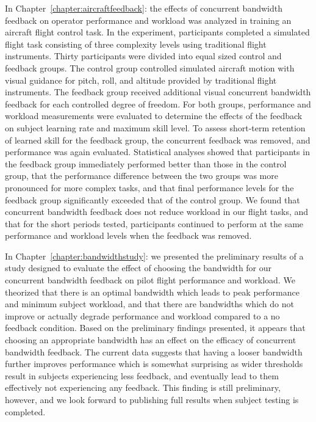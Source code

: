 In Chapter~\ref{chapter:aircraftfeedback}:  the effects of concurrent bandwidth feedback on operator performance and workload was analyzed in training an aircraft flight control task.
In the experiment, participants completed a simulated flight task consisting of three complexity levels using traditional flight instruments.
Thirty participants were divided into equal sized control and feedback groups.
The control group controlled simulated aircraft motion with visual guidance for pitch, roll, and altitude provided by traditional flight instruments.
The feedback group received additional visual concurrent bandwidth feedback for each controlled degree of freedom.
For both groups, performance and workload measurements were evaluated to determine the effects of the feedback on subject learning rate and maximum skill level.
To assess short-term retention of learned skill for the feedback group, the concurrent feedback was removed, and performance was again evaluated.
Statistical analyses showed that participants in the feedback group immediately performed better than those in the control group, that the performance difference between the two groups was more pronounced for more complex tasks, and that final performance levels for the feedback group significantly exceeded that of the control group.
We found that concurrent bandwidth feedback does not reduce workload in our flight tasks, and that for the short periods tested, participants continued to perform at the same performance and workload levels when the feedback was removed.

In Chapter~\ref{chapter:bandwidthstudy}:  we presented the preliminary results of a study designed to evaluate the effect of choosing the bandwidth for our concurrent bandwidth feedback on pilot flight performance and workload.
We theorized that there is an optimal bandwidth which leads to peak performance and minimum subject workload, and that there are bandwidths which do not improve or actually degrade performance and workload compared to a no feedback condition.
Based on the preliminary findings presented, it appears that choosing an appropriate bandwidth has an effect on the efficacy of concurrent bandwidth feedback.
The current data suggests that having a looser bandwidth further improves performance which is somewhat surprising as wider thresholds result in subjects experiencing less feedback, and eventually lead to them effectively not experiencing any feedback.
This finding is still preliminary, however, and we look forward to publishing full results when subject testing is completed.

